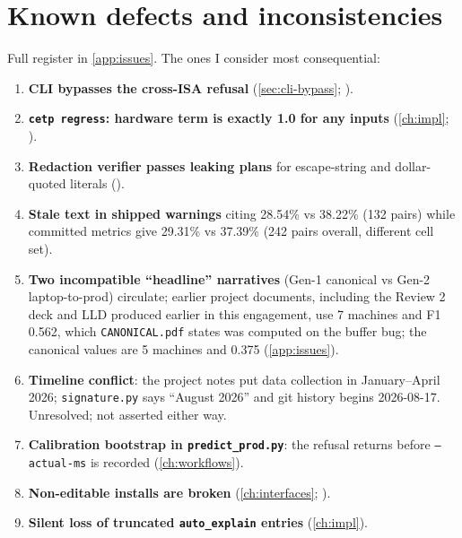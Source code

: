 \section{Known defects and inconsistencies}
Full register in \cref{app:issues}. The ones I consider most consequential:
\begin{enumerate}
\item \textbf{CLI bypasses the cross-ISA refusal} (\cref{sec:cli-bypass}; \evRUN).
\item \textbf{\texttt{cetp regress}: hardware term is exactly 1.0 for any inputs} (\cref{ch:impl}; \evRUN).
\item \textbf{Redaction verifier passes leaking plans} for escape-string and dollar-quoted literals (\evRUN).
\item \textbf{Stale text in shipped warnings} citing 28.54\% vs 38.22\% (132 pairs) while committed metrics give 29.31\% vs 37.39\% (242 pairs overall, different cell set).
\item \textbf{Two incompatible ``headline'' narratives} (Gen-1 canonical vs Gen-2 laptop-to-prod) circulate; earlier project documents, including the Review 2 deck and LLD produced earlier in this engagement, use 7 machines and F1 0.562, which \texttt{CANONICAL.pdf} states was computed on the buffer bug; the canonical values are 5 machines and 0.375 (\cref{app:issues}).
\item \textbf{Timeline conflict}: the project notes put data collection in January--April 2026; \texttt{signature.py} says ``August 2026'' and git history begins 2026-08-17. Unresolved; not asserted either way.
\item \textbf{Calibration bootstrap in \texttt{predict\_prod.py}}: the refusal returns before \texttt{--actual-ms} is recorded (\cref{ch:workflows}).
\item \textbf{Non-editable installs are broken} (\cref{ch:interfaces}; \evRUN).
\item \textbf{Silent loss of truncated \texttt{auto\_explain} entries} (\cref{ch:impl}).
\end{enumerate}

